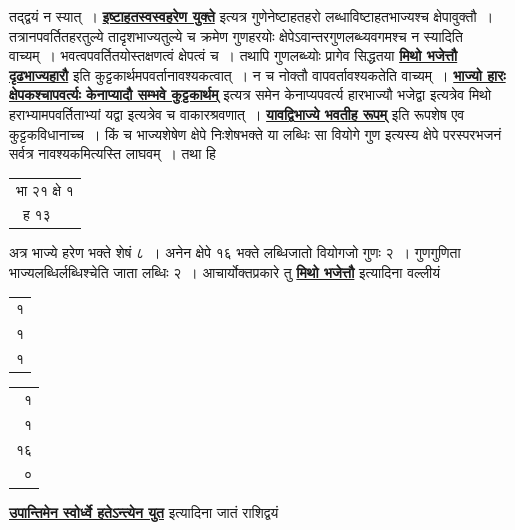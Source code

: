 \documentclass[11pt, openany]{book}
\begin{document}
{{तद्द्वयं न स्यात्~। \hyperref[59]{\textbf{इष्टाहतस्वस्वहरेण युक्ते}} इत्यत्र गुणेनेष्टाहतहरो
लब्धाविष्टाहतभाज्यश्च क्षेपावुक्तौ~। तत्रानपवर्तितहरतुल्ये तादृशभाज्यतुल्ये च
क्रमेण गुणहरयोः क्षेपेऽवान्तरगुणलब्ध्यवगमश्च न स्यादिति वाच्यम्~।
भवत्वपवर्तितयोस्तक्षणत्वं क्षेपत्वं च~। तथापि गुणलब्ध्योः प्रागेव सिद्धतया \hyperref[51]{\textbf{मिथो भजेत्तौ दृढभाज्यहारौ}} इति कुट्टकार्थमपवर्तानावश्यकत्वात्~। न च नोक्तौ
वापवर्तावश्यकतेति वाच्यम्~। \hyperref[50]{\textbf{भाज्यो हारः क्षेपकश्चापवर्त्यः केनाप्यादौ सम्भवे
कुट्टकार्थम्}} इत्यत्र {\qt समेन केनाप्यपवर्त्य हारभाज्यौ भजेद्वा} इत्यत्रेव {\qt मिथो हराभ्यामपवर्तिताभ्यां यद्वा} इत्यत्रेव च वाकारश्रवणात्~। \hyperref[51]{\textbf{यावद्विभाज्ये भवतीह रूपम्}} इति रूपशेष एव कुट्टकविधानाच्च~। किं च भाज्यशेषेण क्षेपे निःशेषभक्ते या 
लब्धिः सा वियोगे गुण इत्यस्य क्षेपे परस्परभजनं सर्वत्र 
नावश्यकमित्यस्ति लाघवम्~। तथा हि\textendash \,
\vspace{-2mm}

\begin{table}[h!]
    \centering\s
    \begin{tabular}{l}
        भा २१ क्षे १\\
~ह १३
    \end{tabular}
\end{table}
 \vspace{-2mm}

\noindent अत्र भाज्ये हरेण भक्ते शेषं ८~। अनेन क्षेपे १६ भक्ते लब्धिजातो 
वियोगजो गुणः २~। {\qt गुणगुणिता भाज्यलब्धिर्लब्धिश्चे}ति जाता लब्धिः २~। 
आचार्योक्तप्रकारे तु \hyperref[51]{\textbf{मिथो भजेत्तौ}} इत्यादिना वल्लीयं
\vspace{-2mm}

\begin{table}[h!]
    \centering\s
    \begin{tabular}{l}
     १\\
 १\\
 १
       \end{tabular}
\end{table}
\newpage
\begin{table}[h!]
    \centering\s
    \begin{tabular}{r}
१\\
१\\
१६\\
०
   \end{tabular}
\end{table}
\vspace{-2mm}

\noindent \hyperref[51]{\textbf{उपान्तिमेन स्वोर्ध्वे हतेऽन्त्येन युत}} इत्यादिना जातं राशिद्वयं
\vspace{-2mm}

}}
\end{document}
